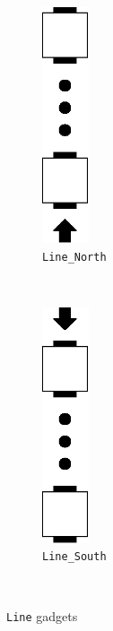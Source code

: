 \begin{figure}[H]
    \centering
    \begin{subfigure}[t]{0.15\textwidth}
        \centering
        \includegraphics[width=0.15\textwidth]{south_to_north_line}
        \caption{\label{fig:north_line} {\tt Line\_North}}
    \end{subfigure}%
    ~
    \begin{subfigure}[t]{0.15\textwidth}
        \centering
        \includegraphics[width=0.15\textwidth]{north_to_south_line}
        \caption{\label{fig:south_line} {\tt Line\_South} }
    \end{subfigure}%
    ~
    \caption{\label{fig:line_gadgets} {\tt Line} gadgets}
\end{figure}

